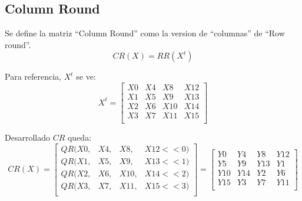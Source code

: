 \documentclass[12pt,a4paper]{report}
\begin{document}
\subsection{Column Round}
\label{sec:columnround}
Se define la matriz ``Column Round'' como la version de ``columnas'' de ``Row round''.
$$
CR(X) = RR(X^t)
$$

Para referencia, $X^t$ se ve:
$$
X^t = \begin{bmatrix}
   X0 & X4 & X8 & X12 \\
   X1 & X5 & X9 & X13 \\
   X2 & X6 & X10 & X14 \\
   X3 & X7 & X11 & X15 \\
    \end{bmatrix}
$$

Desarrollado $CR$ queda:
$$
CR(X) = \begin{bmatrix}
  QR(X0, & X4, & X8, & X12 << 0)\\
  QR(X1, & X5, & X9, & X13 << 1)\\
  QR(X2, & X6, & X10, & X14 << 2)\\
  QR(X3, & X7, & X11, & X15 << 3)\\
\end{bmatrix} =
\begin{bmatrix}
   Y0  & Y4  & Y8  & Y12 \\
   Y5  & Y9  & Y13  & Y1  \\
   Y10 & Y14 & Y2  & Y6 \\
   Y15 & Y3 & Y7 & Y11 \\
    \end{bmatrix}
$$
\end{document}
